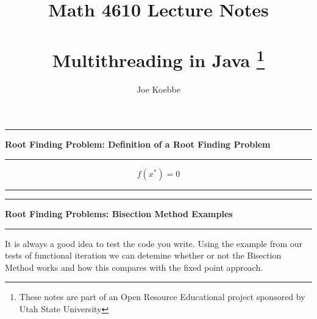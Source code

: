 \documentclass[10pt,fleqn]{article}
\title{Math 4610 Lecture Notes \\
            \ \\
      Multithreading in Java
  \footnote{These notes are part of an Open Resource Educational project
            sponsored by Utah State University}}
\author{Joe Koebbe}
\begin{document}
\maketitle
\newpage
\vskip0.1in\hrule\vskip0.1in
\noindent
{\bf Root Finding Problem: Definition of a Root Finding Problem} 
\vskip0.1in\hrule\vskip0.1in
\noindent
  $$
    f(x^*) = 0
  $$
\vskip0.1in\hrule\vskip0.1in
\newpage
\vskip0.1in\hrule\vskip0.1in
\noindent
{\bf Root Finding Problems: Bisection Method Examples}
\vskip0.1in\hrule\vskip0.1in
\noindent
It is always a good idea to test the code you write. Using the example from our
tests of functional iteration we can detemine whether or not the Bisection 
Method works and how this compares with the fixed point approach.
\end{document}
